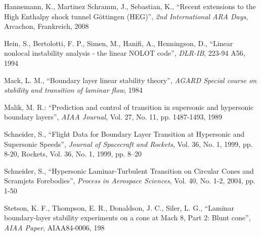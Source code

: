 \documentclass[]{aiaa-tc}%
\begin{document}

\begin{thebibliography}{33}

Hannemann, K., Martinez Schramm, J., Sebastian, K., ``Recent extensions to the High Enthalpy shock tunnel Göttingen (HEG)'', \textit{2nd International ARA Days}, Arcachon, Frankreich, 2008

Hein, S., Bertolotti, F. P.,  Simen, M., Hanifi, A., Henningson, D., ``Linear nonlocal instability analysis - the linear NOLOT code'',  \textit{DLR-IB}, 223-94 A56, 1994

Mack, L. M., ``Boundary layer linear stability theory'', \textit{AGARD Special course on stability and transition of laminar flow},  1984

Malik, M. R.: ``Prediction and control of transition in supersonic and hypersonic boundary layers'', \textit{AIAA Journal}, Vol. 27, No. 11, pp. 1487-1493, 1989

Schneider, S., ``Flight Data for Boundary Layer Transition at Hypersonic and Supersonic Speeds'', \textit{Journal of Spacecraft and Rockets}, Vol. 36, No. 1, 1999, pp. 8-20, Rockets, Vol. 36, No. 1, 1999, pp. 8–20

Schneider, S., ``Hypersonic Laminar-Turbulent Transition on Circular Cones and Scramjets Forebodies'', \textit{Process in Aerospace Sciences}, Vol. 40, No. 1-2, 2004, pp. 1-50

Stetson, K. F., Thompson, E. R., Donaldson, J. C., Siler, L. G., ``Laminar boundary-layer stability experiments on a cone at Mach 8, Part 2: Blunt cone'', \textit{AIAA Paper}, AIAA84-0006, 198


\end{thebibliography}
\end{document}
